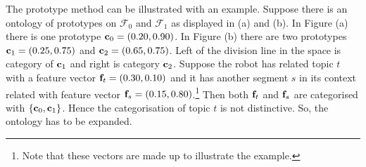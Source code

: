 The prototype method can be illustrated with an example. Suppose there is an ontology of prototypes on ${\mathcal F}_0$ and ${\mathcal F}_1$ as displayed in  (a) and (b). In Figure (a) there is one prototype ${\bf c}_0=(0.20,0.90)$. In Figure (b) there are two prototypes ${\bf c}_1=(0.25,0.75)$ and ${\bf c}_2=(0.65,0.75)$. Left of the division line in the space is category of ${\bf c}_1$ and right is category ${\bf c}_2$. Suppose the robot has related topic $t$ with a feature vector ${\bf f}_t=(0.30,0.10)$ and it has another segment $s$ in its context related with feature vector ${\bf f}_s=(0.15,0.80)$.\footnote{Note that these vectors are made up to illustrate the example.} Then both ${\bf f}_t$ and ${\bf f}_s$ are categorised with $\{{\bf c}_0,{\bf c}_1\}$. Hence the categorisation of topic $t$ is not distinctive. So, the ontology has to be expanded. 

